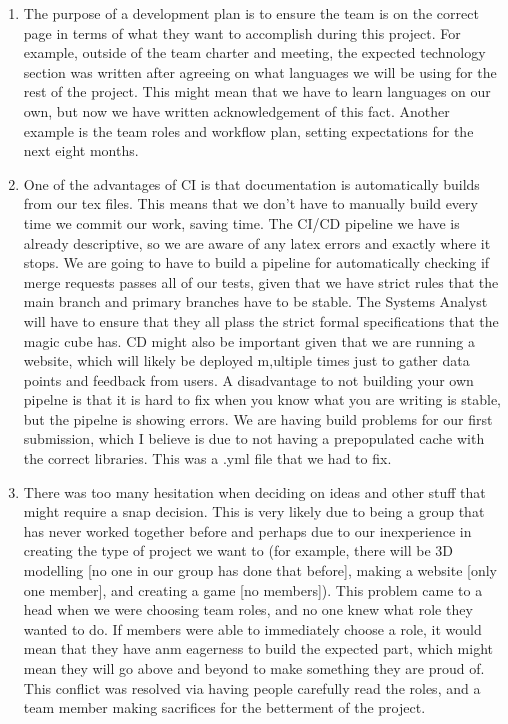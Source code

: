 \documentclass{article}
\begin{document}
\begin{enumerate}
    \item The purpose of a development plan is to ensure the team is on the correct page in terms of what they want to accomplish during this project. For example, outside of the team charter and meeting, the expected technology section was written after agreeing on what languages we will be using for the rest of the project. This might mean that we have to learn languages on our own, but now we have written acknowledgement of this fact. Another example is the team roles and workflow plan, setting expectations for the next eight months. 
    \item One of the advantages of CI is that documentation is automatically builds from our tex files. This means that we don't have to manually build every time we commit our work, saving time. The CI/CD pipeline we have is already descriptive, so we are aware of any latex errors and exactly where it stops. We are going to have to build a pipeline for automatically checking if merge requests passes all of our tests, given that we have strict rules that the main branch and primary branches have to be stable. The Systems Analyst will have to ensure that they all plass the strict formal specifications that the magic cube has. CD might also be important given that we are running a website, which will likely be deployed m,ultiple times just to gather data points and feedback from users. A disadvantage to not building your own pipelne is that it is hard to fix when you know what you are writing is stable, but the pipelne is showing errors. We are having build problems for our first submission, which I believe is due to not having a prepopulated cache with the correct libraries. This was a .yml file that we had to fix.
    \item There was too many hesitation when deciding on ideas and other stuff that might require a snap decision. This is very likely due to being a group that has never worked together before and perhaps due to our inexperience in creating the type of project we want to (for example, there will be 3D modelling [no one in our group has done that before], making a website [only one member], and creating a game [no members]). This problem came to a head when we were choosing team roles, and no one knew what role they wanted to do. If members were able to immediately choose a role, it would mean that they have anm eagerness to build the expected part, which might mean they will go above and beyond to make something they are proud of. This conflict was resolved via having people carefully read the roles, and a team member making sacrifices for the betterment of the project. 
\end{enumerate}
\end{document}
